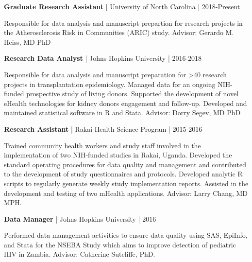 \documentclass[10pt]{article}
\newcommand{\halfblankline}{\quad\vspace{-0.5\baselineskip}\pagebreak[3]}
\begin{document}
\textbf{Graduate Research Assistant} | University of North Carolina | 2018-Present
\begin{innerlist}
    \item Responsible for data analysis and manuscript prepartion
for research projects in the Atherosclerosis Risk in Communities (ARIC)
study.
    Advisor: Gerardo M. Heiss, MD PhD
\end{innerlist}

\halfblankline

\textbf{Research Data Analyst} | Johns Hopkins University | 2016-2018
\begin{innerlist}
    \item Responsible for data analysis and manuscript preparation
    for >40 research projects in transplantation epidemiology. Managed
    data for an ongoing NIH-funded prospective study of living donors.
    Supported the development of novel eHealth technologies for kidney donors
    engagement and follow-up.
    Developed and maintained statistical software in R and Stata.
    Advisor: Dorry Segev, MD PhD
\end{innerlist}

\halfblankline

\textbf{Research Assistant} | Rakai Health Science Program | 2015-2016
\begin{innerlist}
    \item Trained community health workers and study staff involved
    in the implementation of two NIH-funded studies in Rakai, Uganda.
    Developed the standard operating procedures for data quality
    and management and contributed to the development of study
    questionnaires and protocols. Developed analytic R scripts to
    regularly generate weekly study implementation reports.
    Assisted in the development and testing of two mHealth applications.
    Advisor: Larry Chang, MD MPH.
\end{innerlist}

\halfblankline

\textbf{Data Manager} | Johns Hopkins University | 2016
\begin{innerlist}
    \item Performed data management activities to ensure data quality
    using SAS, EpiInfo, and Stata for the NSEBA Study which aims to
    improve detection of pediatric HIV in Zambia. Advisor: Catherine
    Sutcliffe, PhD.
\end{innerlist}

\halfblankline
\end{document}
